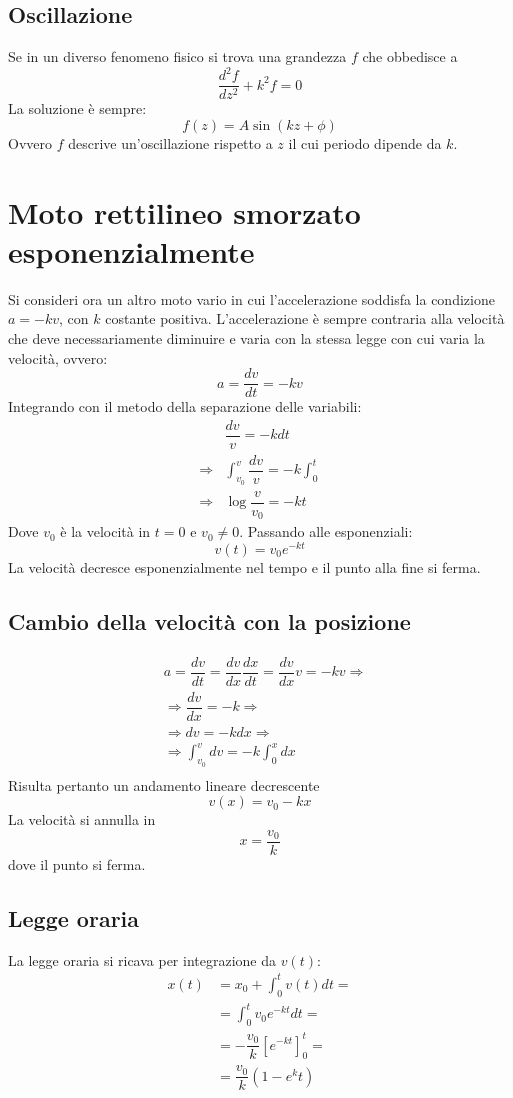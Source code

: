 \documentclass[class=book, crop=false, oneside, 12pt]{standalone}
\begin{document}
	\subsection{Oscillazione}
	Se in un diverso fenomeno fisico si trova una grandezza $f$ che obbedisce a
	$$\dfrac{d^2f}{dz^2}+k^2f=0$$
	La soluzione \`e sempre:
	$$f(z)=A\sin(kz+\phi)$$
	Ovvero $f$ descrive un'oscillazione rispetto a $z$ il cui periodo dipende da $k$.
\section{Moto rettilineo smorzato esponenzialmente}
Si consideri ora un altro moto vario in cui l'accelerazione soddisfa la condizione $a = -kv$, con $k$ costante positiva.
L'accelerazione \`e sempre contraria alla velocit\`a che deve necessariamente diminuire e varia con la stessa legge con cui varia la velocit\`a, ovvero:
$$a = \dfrac{dv}{dt} = -kv$$
Integrando con il metodo della separazione delle variabili:
\begin{align*}
	&\dfrac{dv}{v} = -kdt\\
	\Rightarrow&\int_{v_0}^v\dfrac{dv}{v} = -k\int_0^t\\
	\Rightarrow &\log\dfrac{v}{v_0} = -kt
\end{align*}
Dove $v_0$ \`e la velocit\`a in $t=0$ e $v_0\neq 0$.
Passando alle esponenziali:
$$v(t) = v_0e^{-kt}$$
La velocit\`a decresce esponenzialmente nel tempo e il punto alla fine si ferma.
	\subsection{Cambio della velocit\`a con la posizione}
	\begin{align*}
		&a = \dfrac{dv}{dt}=\dfrac{dv}{dx}\dfrac{dx}{dt}=\dfrac{dv}{dx}v = -kv\Rightarrow\\
		&\Rightarrow \dfrac{dv}{dx}=-k\Rightarrow\\
		&\Rightarrow dv = -kdx\Rightarrow\\
		&\Rightarrow \int_{v_0}^v dv = -k \int_0^xdx\\
	\end{align*}
	Risulta pertanto un andamento lineare decrescente
	$$v(x)=v_0-kx$$
	La velocit\`a si annulla in
	$$x=\dfrac{v_0}{k}$$
	dove il punto si ferma.
	\subsection{Legge oraria}
	La legge oraria si ricava per integrazione da $v(t)$:
	\begin{align*}
		x(t)&=x_0+\int_0^t v(t)dt=\\
		    &=\int_0^tv_0e^{-kt}dt=\\
				&=-\dfrac{v_0}{k}[e^{-kt}]_0^t=\\
				&=\dfrac{v_0}{k}(1-e^kt)
	\end{align*}
\end{document}
